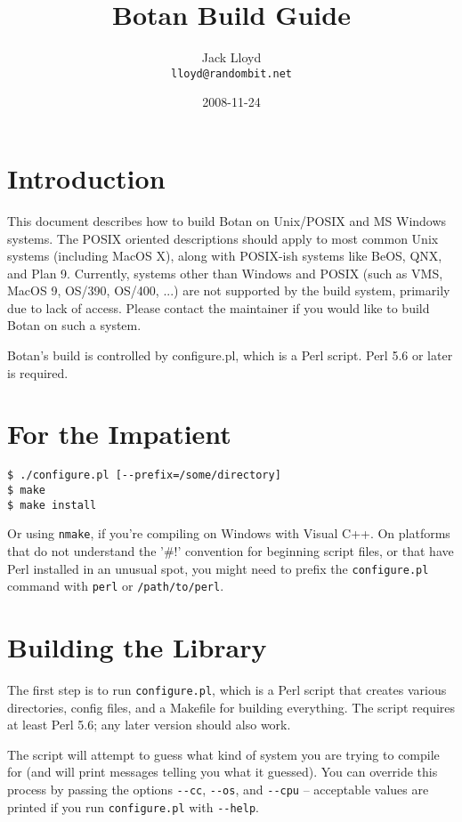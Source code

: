 \documentclass{article}
\title{\textbf{Botan Build Guide}}
\author{Jack Lloyd \\
        \texttt{lloyd@randombit.net}}
\date{2008-11-24}
\newcommand{\filename}[1]{\texttt{#1}}
\begin{document}
\maketitle

\tableofcontents

\parskip=5pt
\pagebreak

\section{Introduction}

This document describes how to build Botan on Unix/POSIX and MS
Windows systems. The POSIX oriented descriptions should apply to most
common Unix systems (including MacOS X), along with POSIX-ish systems
like BeOS, QNX, and Plan 9. Currently, systems other than Windows and
POSIX (such as VMS, MacOS 9, OS/390, OS/400, ...) are not supported by
the build system, primarily due to lack of access. Please contact the
maintainer if you would like to build Botan on such a system.

Botan's build is controlled by configure.pl, which is a Perl
script. Perl 5.6 or later is required.

\section{For the Impatient}

\begin{verbatim}
$ ./configure.pl [--prefix=/some/directory]
$ make
$ make install
\end{verbatim}

Or using \verb|nmake|, if you're compiling on Windows with Visual
C++. On platforms that do not understand the '\#!' convention for
beginning script files, or that have Perl installed in an unusual
spot, you might need to prefix the \texttt{configure.pl} command with
\texttt{perl} or \texttt{/path/to/perl}.

\section{Building the Library}

The first step is to run \filename{configure.pl}, which is a Perl
script that creates various directories, config files, and a Makefile
for building everything. The script requires at least Perl 5.6; any
later version should also work.

The script will attempt to guess what kind of system you are trying
to compile for (and will print messages telling you what it guessed).
You can override this process by passing the options \verb|--cc|,
\verb|--os|, and \verb|--cpu| -- acceptable values are printed if
you run \verb|configure.pl| with \verb|--help|.
\end{document}
